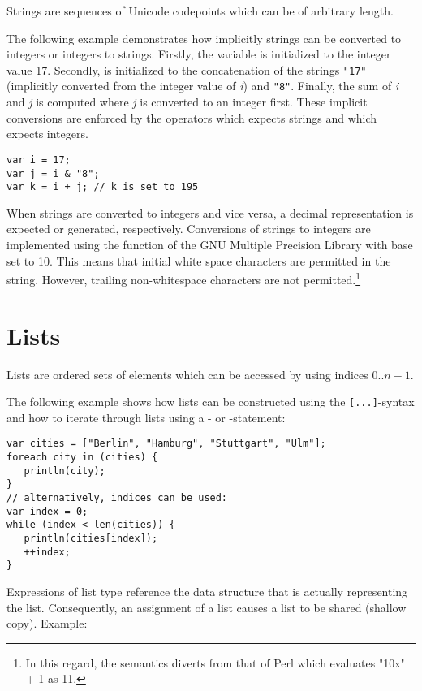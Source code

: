 Strings are sequences of Unicode codepoints which can be of arbitrary length.

The following example demonstrates how implicitly strings can be
converted to integers or integers to strings. Firstly, the variable
 is initialized to the integer value 17. Secondly, 
is initialized to the concatenation of the strings \lstinline!"17"!
(implicitly converted from the integer value of \textit{i}) and
\lstinline!"8"!. Finally, the sum of \textit{i} and \textit{j} is
computed where \textit{j} is converted to an integer first. These
implicit conversions are enforced by the operators \token{\&}
which expects strings and \token{+} which expects integers.

\begin{lstlisting}
var i = 17;
var j = i & "8";
var k = i + j; // k is set to 195
\end{lstlisting}

When strings are converted to integers and vice versa,
a decimal representation is expected or generated, respectively.
Conversions of strings to integers are implemented using
the  function of the
GNU Multiple Precision Library
with base set to 10. This means that initial white space characters are
permitted in the string. However, trailing non-whitespace characters
are not permitted.\footnote{In this regard, the semantics diverts from that of
Perl which evaluates "10x" + 1 as 11.}

\section{Lists}\label{lists}

Lists are ordered sets of elements which can be accessed by
using indices $0..n-1$.

The following example shows how lists can be constructed
using the \lstinline![...]!-syntax and how to iterate through
lists using a - or -statement:

\begin{lstlisting}
var cities = ["Berlin", "Hamburg", "Stuttgart", "Ulm"];
foreach city in (cities) {
   println(city);
}
// alternatively, indices can be used:
var index = 0;
while (index < len(cities)) {
   println(cities[index]);
   ++index;
}
\end{lstlisting}

\noindent
Expressions of list type reference the data structure that is
actually representing the list. Consequently,
an assignment of a list causes a list to be shared
(shallow copy). Example:

